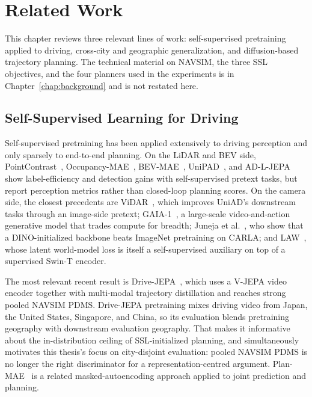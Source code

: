 \chapter{Related Work}
\label{chap:relatedwork}

\noindent
This chapter reviews three relevant lines of work: self-supervised pretraining applied to driving, cross-city and geographic generalization, and diffusion-based trajectory planning. The technical material on NAVSIM, the three SSL objectives, and the four planners used in the experiments is in Chapter~\ref{chap:background} and is not restated here.

\section{Self-Supervised Learning for Driving}
\label{sec:rw-ssl-driving}

Self-supervised pretraining has been applied extensively to driving perception and only sparsely to end-to-end planning. On the LiDAR and BEV side, PointContrast~\cite{xie-pointcontrast-2020}, Occupancy-MAE~\cite{min-occupancymae-2023}, BEV-MAE~\cite{lin-bevmae-2024}, UniPAD~\cite{yang-unipad-2024}, and AD-L-JEPA~\cite{zhu-adljepa-2025} show label-efficiency and detection gains with self-supervised pretext tasks, but report perception metrics rather than closed-loop planning scores. On the camera side, the closest precedents are ViDAR~\cite{yang-vidar-2024}, which improves UniAD's downstream tasks through an image-side pretext; GAIA-1~\cite{hu-gaia1-2023}, a large-scale video-and-action generative model that trades compute for breadth; Juneja et al.~\cite{juneja-dino-e2e-2024}, who show that a DINO-initialized backbone beats ImageNet pretraining on CARLA; and LAW~\cite{li-law-2024}, whose latent world-model loss is itself a self-supervised auxiliary on top of a supervised Swin-T encoder.

The most relevant recent result is Drive-JEPA~\cite{wang-drive-jepa}, which uses a V-JEPA video encoder together with multi-modal trajectory distillation and reaches strong pooled NAVSIM PDMS. Drive-JEPA pretraining mixes driving video from Japan, the United States, Singapore, and China, so its evaluation blends pretraining geography with downstream evaluation geography. That makes it informative about the in-distribution ceiling of SSL-initialized planning, and simultaneously motivates this thesis's focus on city-disjoint evaluation: pooled NAVSIM PDMS is no longer the right discriminator for a representation-centred argument. Plan-MAE~\cite{zhao-planmae-2025} is a related masked-autoencoding approach applied to joint prediction and planning.

